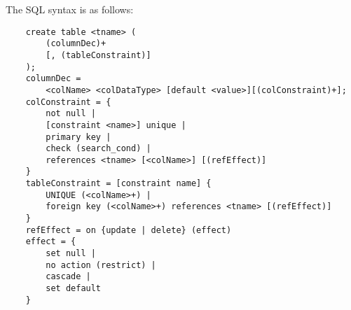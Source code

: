                 The SQL syntax is as follows:
                \begin{verbatim}
    create table <tname> (
        (columnDec)+
        [, (tableConstraint)]
    );
    columnDec =
        <colName> <colDataType> [default <value>][(colConstraint)+];
    colConstraint = {
        not null |
        [constraint <name>] unique |
        primary key |
        check (search_cond) |
        references <tname> [<colName>] [(refEffect)]
    }
    tableConstraint = [constraint name] {
        UNIQUE (<colName>+) |
        foreign key (<colName>+) references <tname> [(refEffect)]
    }
    refEffect = on {update | delete} (effect)
    effect = {
        set null |
        no action (restrict) |
        cascade |
        set default
    }
                \end{verbatim}

